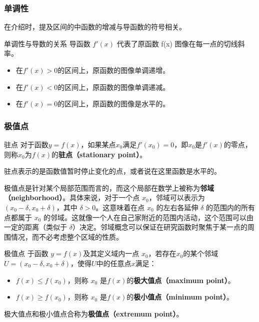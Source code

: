 \subsubsection{单调性}
在介绍时，提及区间的中函数的增减与导函数的符号相关。
\begin{theorem}{单调性与导数的关系}
导函数  $f'(x)$  代表了原函数  f(x)  图像在每一点的切线斜率。
\begin{itemize}
\item 在$f'(x)>0$的区间上，原函数的图像单调递增。
\item 在$f'(x)<0$的区间上，原函数的图像单调递减。
\item 在$f'(x)=0$的区间上，原函数的图像是水平的。
\end{itemize}
\end{theorem}


\subsubsection{极值点}

\begin{definition}{驻点}
对于函数$y=f(x)$，如果某点$x_0$满足$f'(x_0)=0$，即$x_0$是$f'(x)$的零点，则称$x_0$为$f(x)$的\textbf{驻点（stationary point）}。
\end{definition}

驻点表示的是函数值暂时停止变化的点，或者说在这里函数是水平的。

极值点是针对某个局部范围而言的，而这个局部在数学上被称为\textbf{邻域（neighborhood）}。具体来说，对于一个点 $x_0$，邻域可以表示为 $\left( x_0 - \delta, x_0 + \delta \right)$，其中 $\delta > 0$。这意味着在点 $x_0$ 的左右各延伸 $\delta$ 的范围内的所有点都属于 $x_0$ 的邻域。这就像一个人在自己家附近的范围内活动，这个范围可以由一定的距离（类似于 $\delta$）决定。邻域概念可以保证在研究函数时聚焦于某一点的周围情况，而不必考虑整个区域的性质。

\begin{definition}{极值点}
于函数 $y=f(x)$及其定义域内一点 $x_0$，若存在$x_0$的某个邻域$U=\left( x_0-\delta,x_0+\delta \right)$，使得$U$中的任意点$x$满足：
\begin{itemize}
\item $f(x) \leq f\left(x_0\right)$，则称 $x_0$ 是$f(x)$的\textbf{极大值点（maximum point）}。
\item $f(x) \geq f\left(x_0\right)$，则称 $x_0$ 是$f(x)$的\textbf{极小值点（minimum point）}。
\end{itemize}
极大值点和极小值点合称为\textbf{极值点（extremum point）}。
\end{definition}

